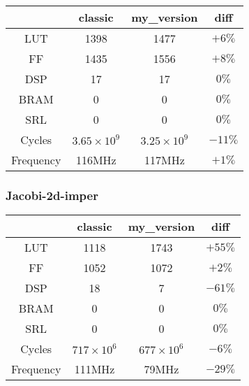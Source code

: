 \documentclass[10pt,a4paper,twoside]{article}
\begin{document}
\begin{tabular}{c|c|c|c}
     & classic & my\_version & diff \\
    \hline
    LUT & 1398 & 1477 & $+6\%$ \\
    \hline
    FF & 1435 & 1556 & $+8\%$ \\
    \hline
    DSP & 17 & 17 & $0\%$ \\
    \hline
    BRAM & 0 & 0 & $0\%$ \\
    \hline
    SRL & 0 & 0 & $0\%$ \\
    \hline
    Cycles & $3.65 \times 10^9$ & $3.25 \times 10^9$ & $-11\%$ \\
    \hline
    Frequency & 116MHz & 117MHz & $+1\%$ \\
\end{tabular}

\subsubsection{Jacobi-2d-imper}

\begin{tabular}{c|c|c|c}
     & classic & my\_version & diff \\
    \hline
    LUT & 1118 & 1743 & $+55\%$ \\
    \hline
    FF & 1052 & 1072 & $+2\%$ \\
    \hline
    DSP & 18 & 7 & $-61\%$ \\
    \hline
    BRAM & 0 & 0 & $0\%$ \\
    \hline
    SRL & 0 & 0 & $0\%$ \\
    \hline
    Cycles & $717 \times 10^6$ & $677 \times 10^6$ & $-6\%$ \\
    \hline
    Frequency & 111MHz & 79MHz &  $-29\%$\\
\end{tabular}
\end{document}
